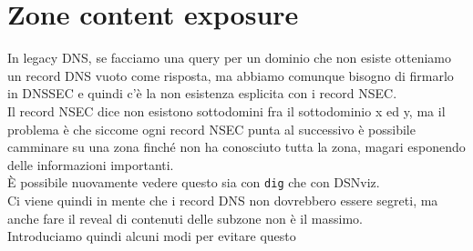 \documentclass[12pt, oneside]{extbook} %
\begin{document}
\section{Zone content exposure}
In legacy DNS, se facciamo una query per un dominio che non esiste otteniamo un record DNS vuoto come risposta, ma abbiamo comunque bisogno di firmarlo in DNSSEC e quindi c'è la non esistenza esplicita con i record NSEC.
\\Il record NSEC dice non esistono sottodomini fra il sottodominio x ed y, ma il problema è che siccome ogni record NSEC punta al successivo è possibile camminare su una zona finché non ha conosciuto tutta la zona, magari esponendo delle informazioni importanti.
\\È possibile nuovamente vedere questo sia con \texttt{dig} che con DSNviz.
\\Ci viene quindi in mente che i record DNS non dovrebbero essere segreti, ma anche fare il reveal di contenuti delle subzone non è il massimo.
\\Introduciamo quindi alcuni modi per evitare questo
\end{document}
